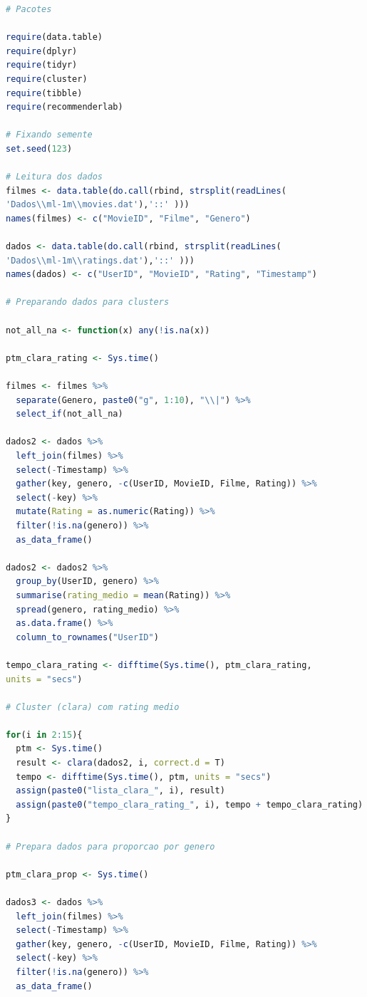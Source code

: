\documentclass[12pt,a4paper,header]{abnt}
\begin{document}
\begin{lstlisting}[language=R]
# Pacotes

require(data.table)
require(dplyr)
require(tidyr)
require(cluster)
require(tibble)
require(recommenderlab)

# Fixando semente
set.seed(123)

# Leitura dos dados
filmes <- data.table(do.call(rbind, strsplit(readLines(
'Dados\\ml-1m\\movies.dat'),'::' )))
names(filmes) <- c("MovieID", "Filme", "Genero")

dados <- data.table(do.call(rbind, strsplit(readLines(
'Dados\\ml-1m\\ratings.dat'),'::' )))
names(dados) <- c("UserID", "MovieID", "Rating", "Timestamp")

# Preparando dados para clusters

not_all_na <- function(x) any(!is.na(x))

ptm_clara_rating <- Sys.time()
  
filmes <- filmes %>%
  separate(Genero, paste0("g", 1:10), "\\|") %>% 
  select_if(not_all_na) 
  
dados2 <- dados %>%
  left_join(filmes) %>% 
  select(-Timestamp) %>% 
  gather(key, genero, -c(UserID, MovieID, Filme, Rating)) %>% 
  select(-key) %>% 
  mutate(Rating = as.numeric(Rating)) %>% 
  filter(!is.na(genero)) %>% 
  as_data_frame()

dados2 <- dados2 %>% 
  group_by(UserID, genero) %>% 
  summarise(rating_medio = mean(Rating)) %>% 
  spread(genero, rating_medio) %>% 
  as.data.frame() %>% 
  column_to_rownames("UserID")

tempo_clara_rating <- difftime(Sys.time(), ptm_clara_rating, 
units = "secs")

# Cluster (clara) com rating medio

for(i in 2:15){
  ptm <- Sys.time()
  result <- clara(dados2, i, correct.d = T)
  tempo <- difftime(Sys.time(), ptm, units = "secs")
  assign(paste0("lista_clara_", i), result)
  assign(paste0("tempo_clara_rating_", i), tempo + tempo_clara_rating)
}

# Prepara dados para proporcao por genero

ptm_clara_prop <- Sys.time()

dados3 <- dados %>%
  left_join(filmes) %>% 
  select(-Timestamp) %>% 
  gather(key, genero, -c(UserID, MovieID, Filme, Rating)) %>% 
  select(-key) %>% 
  filter(!is.na(genero)) %>% 
  as_data_frame()


\end{lstlisting}
\end{document}
